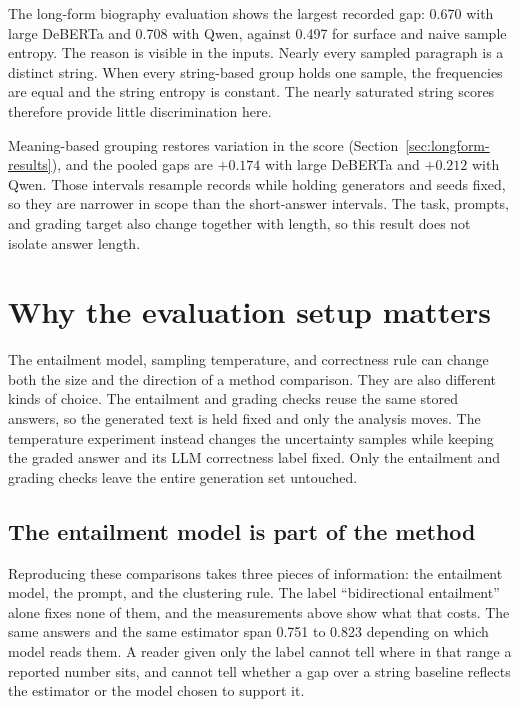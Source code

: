 The long-form biography evaluation shows the largest recorded gap:
0.670 with large DeBERTa and 0.708 with Qwen, against 0.497 for surface and
naive sample entropy. The reason is visible in the inputs. Nearly every sampled
paragraph is a distinct string. When every string-based group holds one sample,
the frequencies are equal and the string entropy is constant. The nearly
saturated string scores therefore provide little discrimination here.

Meaning-based grouping restores variation in the score
(Section~\ref{sec:longform-results}), and the pooled gaps are $+0.174$ with
large DeBERTa and $+0.212$ with Qwen. Those intervals resample records while
holding generators and seeds fixed, so they are narrower in scope than the
short-answer intervals. The task, prompts, and grading target also change
together with length, so this result does not isolate answer length.

\section{Why the evaluation setup matters}
\label{sec:apparatus}

The entailment model, sampling temperature, and correctness rule can change both
the size and the direction of a method comparison. They are also different kinds
of choice. The entailment and grading checks reuse the same stored answers, so
the generated text is held fixed and only the analysis moves. The temperature
experiment instead changes the uncertainty samples while keeping the graded
answer and its LLM correctness label fixed. Only the entailment and grading
checks leave the entire generation set untouched.

\subsection{The entailment model is part of the method}

Reproducing these comparisons takes three pieces of information: the entailment
model, the prompt, and the clustering rule. The label ``bidirectional
entailment'' alone fixes none of them, and the measurements above show what
that costs. The same answers and the same estimator span 0.751 to 0.823
depending on which model reads them. A reader given only the label cannot tell
where in that range a reported number sits, and cannot tell whether a gap over
a string baseline reflects the estimator or the model chosen to support it.

